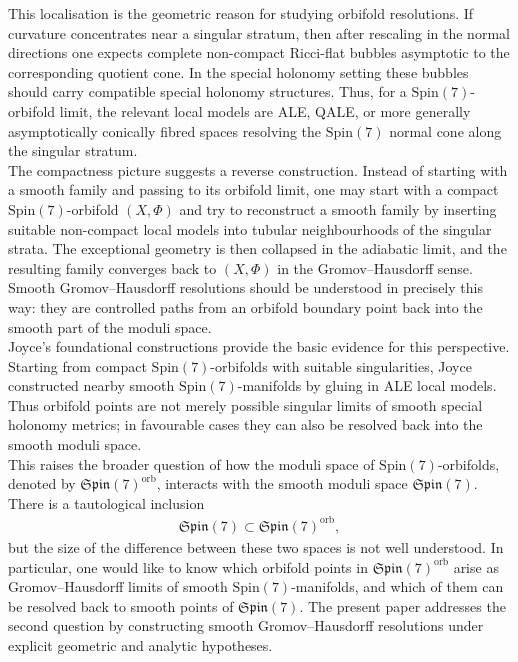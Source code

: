 \documentclass[psamsfonts]{amsart}
\theoremstyle{plain}
\theoremstyle{definition}{
\newtheorem{defi}{Definition}[section]
\newtheorem{ass}{Assumption}
\newtheorem*{nota}{Notation}}
\theoremstyle{remark}{
\newtheorem{rem}{Remark}
\newtheorem{ex}{Example}}
\theoremstyle{plain}{
\newtheorem{thm}{Theorem}[section]
\newtheorem{lem}{Lemma}[section]
\newtheorem{cor}{Corollary}[section]
\newtheorem{prop}{Proposition}[section]
\newtheorem{con}{Conjecture}[section]}
\newcommand{\m}[1]{{\mathrm{#1}}}
\begin{document}
This localisation is the geometric reason for studying orbifold resolutions. If curvature concentrates near a singular stratum, then after rescaling in the normal directions one expects complete non-compact Ricci-flat bubbles asymptotic to the corresponding quotient cone. In the special holonomy setting these bubbles should carry compatible special holonomy structures. Thus, for a $\m{Spin}(7)$-orbifold limit, the relevant local models are ALE, QALE, or more generally asymptotically conically fibred spaces resolving the $\m{Spin}(7)$ normal cone along the singular stratum.\\

The compactness picture suggests a reverse construction. Instead of starting with a smooth family and passing to its orbifold limit, one may start with a compact $\m{Spin}(7)$-orbifold $(X,\Phi)$ and try to reconstruct a smooth family by inserting suitable non-compact local models into tubular neighbourhoods of the singular strata. The exceptional geometry is then collapsed in the adiabatic limit, and the resulting family converges back to $(X,\Phi)$ in the Gromov--Hausdorff sense. Smooth Gromov--Hausdorff resolutions should be understood in precisely this way: they are controlled paths from an orbifold boundary point back into the smooth part of the moduli space.\\

Joyce's foundational constructions \cite{Joyce1996b,Joyce1999} provide the basic evidence for this perspective. Starting from compact $\m{Spin}(7)$-orbifolds with suitable singularities, Joyce constructed nearby smooth $\m{Spin}(7)$-manifolds by gluing in ALE local models. Thus orbifold points are not merely possible singular limits of smooth special holonomy metrics; in favourable cases they can also be resolved back into the smooth moduli space.\\

This raises the broader question of how the moduli space of $\m{Spin}(7)$-orbifolds, denoted by $\mathfrak{Spin}(7)^{\m{orb}}$, interacts with the smooth moduli space $\mathfrak{Spin}(7)$. There is a tautological inclusion
\begin{align*}
    \mathfrak{Spin}(7)\subset \mathfrak{Spin}(7)^{\m{orb}},
\end{align*}
but the size of the difference between these two spaces is not well understood. In particular, one would like to know which orbifold points in $\mathfrak{Spin}(7)^{\m{orb}}$ arise as Gromov--Hausdorff limits of smooth $\m{Spin}(7)$-manifolds, and which of them can be resolved back to smooth points of $\mathfrak{Spin}(7)$. The present paper addresses the second question by constructing smooth Gromov--Hausdorff resolutions under explicit geometric and analytic hypotheses.\\
\end{document}
